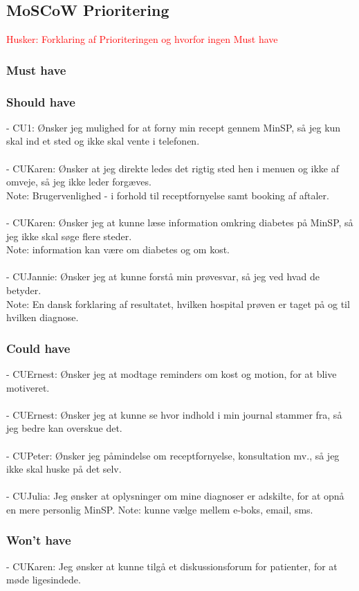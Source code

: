 \subsection{MoSCoW Prioritering}
\textcolor{red}{Husker: Forklaring af Prioriteringen og hvorfor ingen Must have}\\
\subsubsection*{Must have}
\subsubsection*{Should have}
- CU1: Ønsker jeg mulighed for at forny min recept gennem MinSP, så jeg kun skal ind et sted og ikke skal vente i telefonen.\\
\\ 
- CUKaren: Ønsker at jeg direkte ledes det rigtig sted hen i menuen og ikke af omveje, så jeg ikke leder forgæves. \\
Note: Brugervenlighed - i forhold til receptfornyelse samt booking af aftaler.\\
\\ 
- CUKaren: Ønsker jeg at kunne læse information omkring diabetes på MinSP, så jeg ikke skal søge flere steder. \\
Note: information kan være om diabetes og om kost.\\ 
\\
- CUJannie: Ønsker jeg at kunne forstå min prøvesvar, så jeg ved hvad de betyder. \\
Note: En dansk forklaring af resultatet, hvilken hospital prøven er taget på og til hvilken diagnose.

\subsubsection*{Could have}
- CUErnest: Ønsker jeg at modtage reminders om kost og motion, for at blive motiveret.\\
\\
- CUErnest: Ønsker jeg at kunne se hvor indhold i min journal stammer fra, så jeg bedre kan overskue det.\\
\\
- CUPeter: Ønsker jeg påmindelse om receptfornyelse, konsultation mv., så jeg ikke skal huske på det selv.\\ 
\\
- CUJulia: Jeg ønsker at oplysninger om mine diagnoser er adskilte, for at opnå en mere personlig MinSP.
Note: kunne vælge mellem e-boks, email, sms.\\
\subsubsection*{Won't have}
- CUKaren: Jeg ønsker at kunne tilgå et diskussionsforum for patienter, for at møde ligesindede.\\